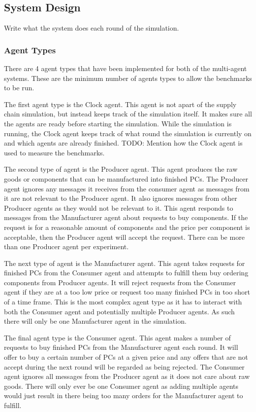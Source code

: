 \subsection{System Design}

Write what the system does each round of the simulation.

\subsubsection{Agent Types}

There are 4 agent types that have been implemented for both of the multi-agent systems.
These are the minimum number of agents types to allow the benchmarks to be run.

The first agent type is the Clock agent.
This agent is not apart of the supply chain simulation, but instead keeps track of the simulation itself.
It makes sure all the agents are ready before starting the simulation.
While the simulation is running, the Clock agent keeps track of what round the simulation is currently on and which agents are already finished.
TODO\@: Mention how the Clock agent is used to measure the benchmarks.

The second type of agent is the Producer agent.
This agent produces the raw goods or components that can be manufactured into finished PCs.
The Producer agent ignores any messages it receives from the consumer agent as messages from it are not relevant to the Producer agent.
It also ignores messages from other Producer agents as they would not be relevant to it.
This agent responds to messages from the Manufacturer agent about requests to buy components.
If the request is for a reasonable amount of components and the price per component is acceptable, then the Producer agent will accept the request.
There can be more than one Producer agent per experiment.

The next type of agent is the Manufacturer agent.
This agent takes requests for finished PCs from the Consumer agent and attempts to fulfill them buy ordering components from Producer agents.
It will reject requests from the Consumer agent if they are at a too low price or request too many finished PCs in too short of a time frame.
This is the most complex agent type as it has to interact with both the Consumer agent and potentially multiple Producer agents.
As such there will only be one Manufacturer agent in the simulation.

The final agent type is the Consumer agent.
This agent makes a number of requests to buy finished PCs from the Manufacturer agent each round.
It will offer to buy a certain number of PCs at a given price and any offers that are not accept during the next round will be regarded as being rejected.
The Consumer agent ignores all messages from the Producer agent as it does not care about raw goods.
There will only ever be one Consumer agent as adding multiple agents would just result in there being too many orders for the Manufacturer agent to fulfill.

